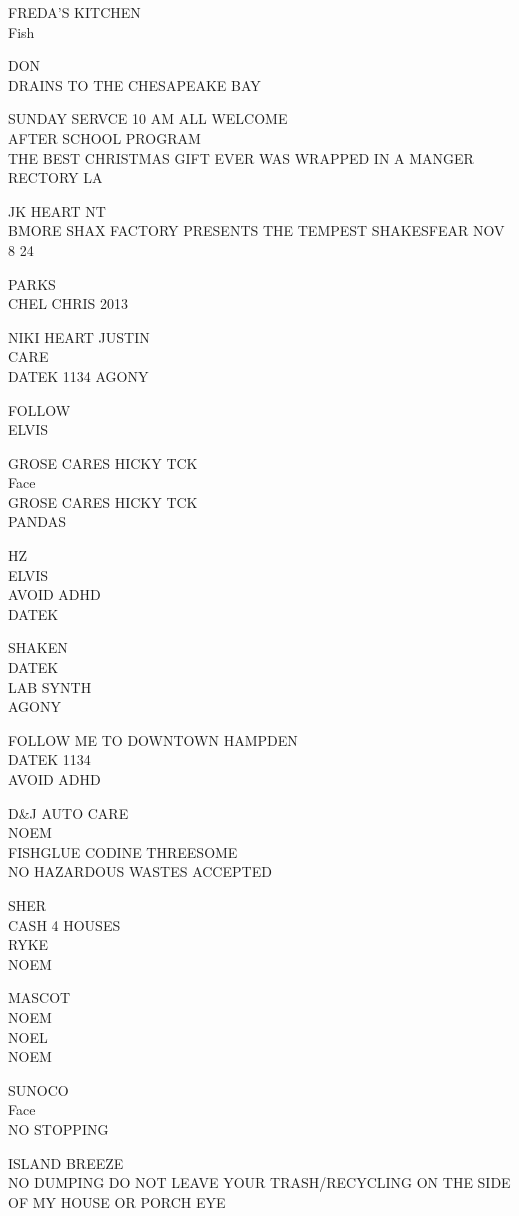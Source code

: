 \documentclass[10pt,letterpaper]{article}
\begin{document}
FREDA'S KITCHEN\\
Fish

DON\\
DRAINS TO THE CHESAPEAKE BAY

SUNDAY SERVCE 10 AM ALL WELCOME\\
AFTER SCHOOL PROGRAM\\
THE BEST CHRISTMAS GIFT EVER WAS WRAPPED IN A MANGER\\
RECTORY LA

JK HEART NT\\
BMORE SHAX FACTORY PRESENTS THE TEMPEST SHAKESFEAR NOV 8 24

PARKS\\
CHEL CHRIS 2013

NIKI HEART JUSTIN\\
CARE\\
DATEK 1134 AGONY

FOLLOW\\
ELVIS

GROSE CARES HICKY TCK\\
Face\\
GROSE CARES HICKY TCK\\
PANDAS

HZ\\
ELVIS\\
AVOID ADHD\\
DATEK

SHAKEN\\
DATEK\\
LAB SYNTH\\
AGONY

FOLLOW ME TO DOWNTOWN HAMPDEN\\
DATEK 1134\\
AVOID ADHD

D\&J AUTO CARE\\
NOEM\\
FISHGLUE CODINE THREESOME\\
NO HAZARDOUS WASTES ACCEPTED

SHER\\
CASH 4 HOUSES\\
RYKE\\
NOEM

MASCOT\\
NOEM\\
NOEL\\
NOEM

SUNOCO\\
Face\\
NO STOPPING

ISLAND BREEZE\\
NO DUMPING DO NOT LEAVE YOUR TRASH/RECYCLING ON THE SIDE OF MY HOUSE OR PORCH EYE
\end{document}

